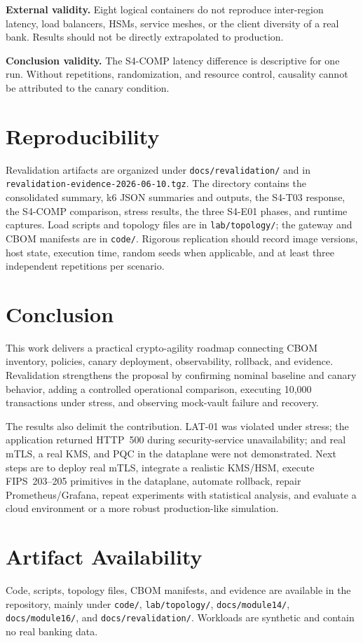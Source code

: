 \documentclass[12pt]{article}
\begin{document}
\textbf{External validity.} Eight logical containers do not reproduce inter-region latency, load balancers, HSMs, service meshes, or the client diversity of a real bank. Results should not be directly extrapolated to production.

\textbf{Conclusion validity.} The S4-COMP latency difference is descriptive for one run. Without repetitions, randomization, and resource control, causality cannot be attributed to the canary condition.

\section{Reproducibility}
Revalidation artifacts are organized under \texttt{docs/revalidation/} and in \texttt{revalidation-evidence-2026-06-10.tgz}. The directory contains the consolidated summary, k6 JSON summaries and outputs, the S4-T03 response, the S4-COMP comparison, stress results, the three S4-E01 phases, and runtime captures. Load scripts and topology files are in \texttt{lab/topology/}; the gateway and CBOM manifests are in \texttt{code/}. Rigorous replication should record image versions, host state, execution time, random seeds when applicable, and at least three independent repetitions per scenario.

\section{Conclusion}
This work delivers a practical crypto-agility roadmap connecting CBOM inventory, policies, canary deployment, observability, rollback, and evidence. Revalidation strengthens the proposal by confirming nominal baseline and canary behavior, adding a controlled operational comparison, executing 10,000 transactions under stress, and observing mock-vault failure and recovery.

The results also delimit the contribution. LAT-01 was violated under stress; the application returned HTTP~500 during security-service unavailability; and real mTLS, a real KMS, and PQC in the dataplane were not demonstrated. Next steps are to deploy real mTLS, integrate a realistic KMS/HSM, execute FIPS~203--205 primitives in the dataplane, automate rollback, repair Prometheus/Grafana, repeat experiments with statistical analysis, and evaluate a cloud environment or a more robust production-like simulation.

\section*{Artifact Availability}
Code, scripts, topology files, CBOM manifests, and evidence are available in the repository, mainly under \texttt{code/}, \texttt{lab/topology/}, \texttt{docs/module14/}, \texttt{docs/module16/}, and \texttt{docs/revalidation/}. Workloads are synthetic and contain no real banking data.



\end{document}
